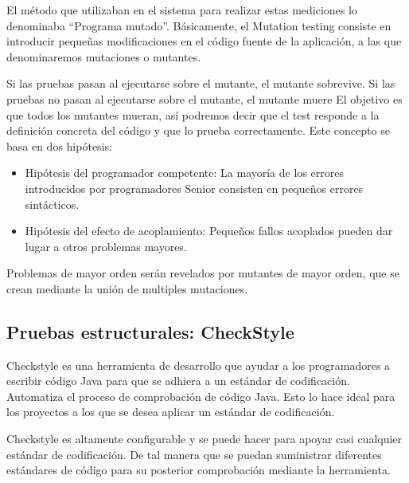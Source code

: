 \documentclass[12pt, a4paper, titlepage]{article}
\begin{document}
	El  método que utilizaban en el sistema para realizar estas mediciones lo denominaba “Programa mutado”.
	Básicamente, el Mutation testing consiste en introducir pequeñas modificaciones en el código fuente de la aplicación, a las que denominaremos mutaciones o mutantes.
	
	Si las pruebas pasan al ejecutarse sobre el mutante, el mutante sobrevive.
	Si las pruebas no pasan al ejecutarse sobre el mutante, el mutante muere
	El objetivo es que todos los mutantes mueran, así podremos decir que el test responde a la definición concreta del código y que lo prueba correctamente.
	Este concepto se basa en dos hipótesis:
	\begin{itemize}
	\item Hipótesis del programador competente: La mayoría de los errores introducidos por programadores Senior consisten en pequeños errores sintácticos.
	\item Hipótesis del efecto de acoplamiento: Pequeños fallos acoplados pueden dar lugar a otros problemas mayores.
		\end{itemize}
	Problemas de mayor orden serán revelados por mutantes de mayor orden, que se crean mediante la unión de multiples mutaciones.
	
		\subsection{Pruebas estructurales: CheckStyle}
		
		Checkstyle es una herramienta de desarrollo que ayudar a los programadores a escribir código Java para que se adhiera a un estándar de codificación. Automatiza el proceso de comprobación de código Java. Esto lo hace ideal para los proyectos a los que se desea aplicar un estándar de codificación.
		
		Checkstyle es altamente configurable y se puede hacer para apoyar casi cualquier estándar de codificación. De tal manera que se puedan suministrar diferentes estándares de código para su posterior comprobación mediante la herramienta.
		
\end{document}
